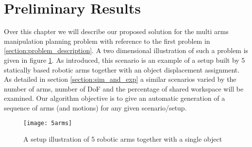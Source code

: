 
\section{Preliminary Results}

Over this chapter we will describe our proposed solution for the multi arms manipulation planning problem with reference to the first problem in \ref{section:problem_description}. A two dimensional illustration of such a problem is given in figure \ref{fig:case_study}. As introduced, this scenario is an example of a setup built by 5 statically based robotic arms together with an object displacement assignment. As detailed in section \ref{section:sim_and_exp} a similar scenarios varied by the number of arms, number of DoF and the percentage of shared workspace will be examined. Our algorithm objective is to give an automatic generation of a sequence of arms (and motions) for any given scenario/setup.
 
\begin{figure}[htb]
\texttt{[image: 5arms]}
\centering
\caption{A setup illustration of 5 robotic arms together with a single object} 
\label{fig:case_study}
\centering
\end{figure}



